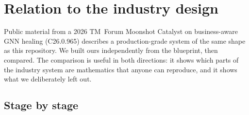 \chapter{Relation to the industry design}
\label{ch:industry}

Public material from a 2026 TM~Forum Moonshot Catalyst on business-aware GNN healing
(C26.0.965) describes a production-grade system of the same shape as this repository. We built
ours independently from the blueprint, then compared. The comparison is useful in both directions:
it shows which parts of the industry system are mathematics that anyone can reproduce, and it
shows what we deliberately left out.

\section{Stage by stage}
